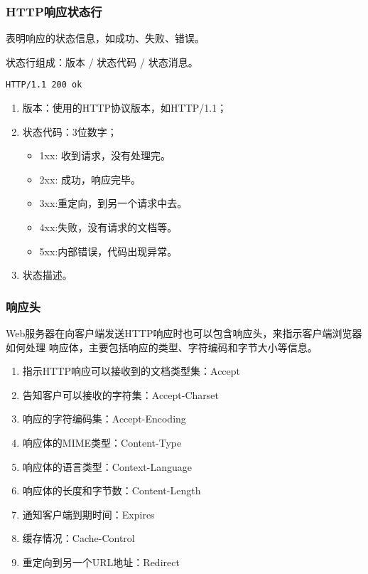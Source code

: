 \begin{frame} %
\frametitle{ HTTP响应状态行} 

表明响应的状态信息，如成功、失败、错误。

状态行组成：{\kai\Red 版本 / 状态代码 / 状态消息}。


\begin{verbatim}
HTTP/1.1 200 ok
\end{verbatim}

\begin{enumerate}
\item 版本：使用的HTTP协议版本，如HTTP/1.1；
\item 状态代码：3位数字；
  \begin{itemize}
  \item 1xx: 收到请求，没有处理完。
  \item 2xx: 成功，响应完毕。
  \item 3xx:重定向，到另一个请求中去。
  \item 4xx:失败，没有请求的文档等。
  \item 5xx:内部错误，代码出现异常。
  \end{itemize}
\item 状态描述。
\end{enumerate}
\end{frame}

\begin{frame}[fragile] %
\frametitle{ 响应头} 

Web服务器在向客户端发送HTTP响应时也可以包含响应头，来指示客户端浏览器如何处理
响应体，主要包括响应的类型、字符编码和字节大小等信息。


\begin{enumerate}\kai\small
\item 指示HTTP响应可以接收到的文档类型集：Accept
\item 告知客户可以接收的字符集：Accept-Charset
\item 响应的字符编码集：Accept-Encoding
\item 响应体的MIME类型：Content-Type
\item 响应体的语言类型：Context-Language
\item 响应体的长度和字节数：Content-Length
\item 通知客户端到期时间：Expires
\item 缓存情况：Cache-Control
\item 重定向到另一个URL地址：Redirect
\end{enumerate}

\end{frame}

